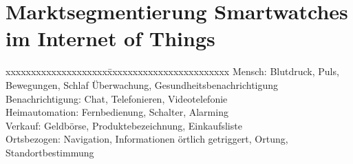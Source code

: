 \section{Marktsegmentierung Smartwatches im Internet of Things}
\begin{tabbing}
xxxxxxxxxxxxxxxxxxxx\=xxxxxxxxxxxxxxxxxxxxxxxx	\kill
Mensch:		        \> Blutdruck, Puls, Bewegungen, Schlaf Überwachung, Gesundheitsbenachrichtigung \\
Benachrichtigung:	\> Chat, Telefonieren, Videotelefonie \\
Heimautomation:	  \> Fernbedienung, Schalter, Alarming \\
Verkauf:		      \> Geldbörse, Produktebezeichnung, Einkaufsliste \\
Ortsbezogen:		  \> Navigation, Informationen örtlich getriggert, Ortung, Standortbestimmung \\
\end{tabbing}
